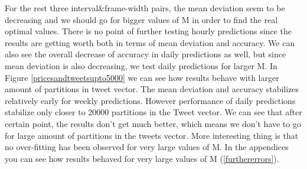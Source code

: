 \documentclass[a4paper,11pt,oneside]{article}
\begin{document}
  For the rest three interval\&frame-width  pairs, the mean deviation seem to be decreasing and we should go for bigger values of M in order to find the real optimal values. There is no point of further testing hourly predictions since the results are getting worth both in terms of mean deviation and accuracy. We can also see the overall decrease of accuracy in daily predictions as well, but since mean deviation is also decreasing, we test daily predictions for larger M. In Figure \ref{pricesandtweetsupto5000} we can see how results behave with larger amount of partitions in tweet vector. The mean deviation and accuracy stabilizes relatively early for weekly predictions. However performance of daily predictions stabilize only closer to 20000 partitions in the Tweet vector. We can see that after certain point, the results don't get much better, which means we don't have to go for large amount of partitions in the tweets vector. More interesting thing is that no over-fitting has been observed for very large values of M. In the appendices you can see how results behaved for very large values of M (\ref{furthererrors}).
  
\end{document}
